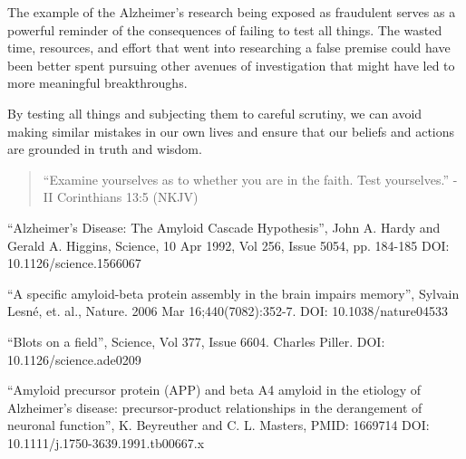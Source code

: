 \documentclass[10pt]{article}
\begin{document}
\begin{multicols}{2}
The example of the Alzheimer's research being exposed as fraudulent serves as a powerful reminder of the consequences of failing to test all things. The wasted time, resources, and effort that went into researching a false premise could have been better spent pursuing other avenues of investigation that might have led to more meaningful breakthroughs.

By testing all things and subjecting them to careful scrutiny, we can avoid making similar mistakes in our own lives and ensure that our beliefs and actions are grounded in truth and wisdom.

\begin{quotation}
	``Examine yourselves as to whether you are in the faith. Test yourselves.'' - II Corinthians 13:5 (NKJV)
\end{quotation}

\begin{thebibliography}{9}
	{\footnotesize
	 ``Alzheimer's Disease: The Amyloid Cascade Hypothesis'', John A. Hardy and Gerald A. Higgins, Science,	10 Apr 1992, Vol 256, Issue 5054, pp. 184-185 DOI: 10.1126/science.1566067
			
	 ``A specific amyloid-beta protein assembly in the brain impairs memory'', Sylvain Lesné, et. al., Nature. 2006 Mar 16;440(7082):352-7. DOI: 10.1038/nature04533
	
	 ``Blots on a field'', Science, Vol 377, Issue 6604. Charles Piller. DOI: 10.1126/science.ade0209 
	
	 ``Amyloid precursor protein (APP) and beta A4 amyloid in the etiology of Alzheimer's disease: precursor-product relationships in the derangement of neuronal function'', K. Beyreuther and C. L. Masters, PMID: 1669714 DOI: 10.1111/j.1750-3639.1991.tb00667.x 
	
	}
\end{thebibliography}

\end{multicols}


\end{document}
